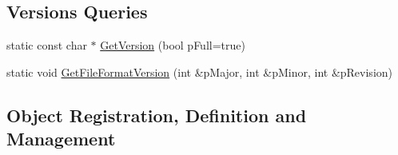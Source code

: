 \subsection*{Versions Queries}
\begin{DoxyCompactItemize}
\item 
static const char $\ast$ \hyperlink{class_fbx_manager_ac137167b0408326c6dbe1ce14004e800}{Get\+Version} (bool p\+Full=true)
\item 
static void \hyperlink{class_fbx_manager_a059da48febc59c5dfc2626355c0dadbb}{Get\+File\+Format\+Version} (int \&p\+Major, int \&p\+Minor, int \&p\+Revision)
\end{DoxyCompactItemize}
\subsection*{Object Registration, Definition and Management}
